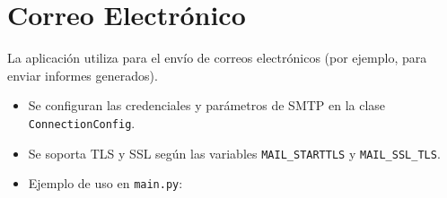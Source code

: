 \documentclass[a4paper,11pt,spanish]{sphinxmanual}
\newcommand{\robotoMonoBold}{\fontseries{b}\selectfont\ttfamily}
\renewcommand{\sphinxcode}[1]{\textcolor{sphinxorangeCode}{{\robotoMonoBold #1}}}
\renewcommand{\sphinxupquote}[1]{\texttt{#1}}
\begin{document}
\section{Correo Electrónico}
\label{\detokenize{configuracion:correo-electronico}}
\sphinxAtStartPar
La aplicación utiliza  para el envío de correos electrónicos (por ejemplo, para enviar informes generados).
\begin{itemize}
\item {} 
\sphinxAtStartPar
Se configuran las credenciales y parámetros de SMTP en la clase \sphinxcode{\sphinxupquote{ConnectionConfig}}.

\item {} 
\sphinxAtStartPar
Se soporta TLS y SSL según las variables \sphinxcode{\sphinxupquote{MAIL\_STARTTLS}} y \sphinxcode{\sphinxupquote{MAIL\_SSL\_TLS}}.

\item {} 
\sphinxAtStartPar
Ejemplo de uso en \sphinxcode{\sphinxupquote{main.py}}:

\end{itemize}
\end{document}
